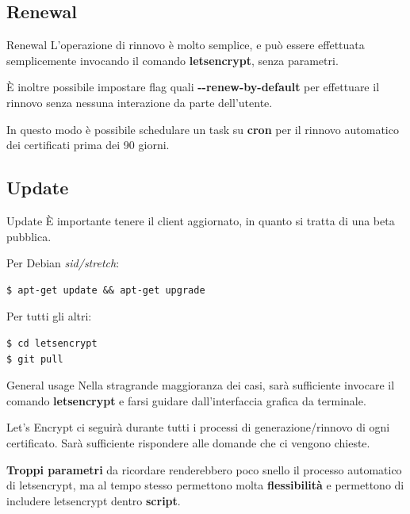 \documentclass[xcolor=svgnames,11pt]{beamer}
\begin{document}
\subsection{Renewal}
\begin{frame}[fragile]{Renewal}
L'operazione di rinnovo è molto semplice, e può essere effettuata semplicemente
invocando il comando \textbf{letsencrypt}, senza parametri.

\medskip\pause

È inoltre possibile impostare flag quali \textbf{-{}-renew-by-default} per effettuare
il rinnovo senza nessuna interazione da parte dell'utente.

\medskip\pause

In questo modo è possibile schedulare un task su \textbf{cron} per il rinnovo
automatico dei certificati prima dei 90 giorni.

\end{frame}

\subsection{Update}
\begin{frame}[fragile]{Update}
È importante tenere il client aggiornato, in quanto si tratta di una beta pubblica.


\medskip\pause
Per Debian \emph{sid/stretch}:
\begin{block}{}
\begin{scriptsize}
\begin{verbatim}
$ apt-get update && apt-get upgrade
\end{verbatim}
\end{scriptsize}
\end{block}

\medskip\pause
Per tutti gli altri:
\begin{block}{}
\begin{scriptsize}
\begin{verbatim}
$ cd letsencrypt
$ git pull
\end{verbatim}
\end{scriptsize}
\end{block}

\end{frame}

\begin{frame}[fragile]{General usage}
Nella stragrande maggioranza dei casi, sarà sufficiente invocare il comando
\textbf{letsencrypt} e farsi guidare dall'interfaccia grafica da terminale.

\medskip\pause

Let's Encrypt ci seguirà durante tutti i processi di generazione/rinnovo
di ogni certificato. Sarà sufficiente rispondere alle domande che ci vengono
chieste.

\medskip\pause

\textbf{Troppi parametri} da ricordare renderebbero poco snello il processo automatico
di letsencrypt, ma al tempo stesso permettono molta \textbf{flessibilità} e permettono
di includere letsencrypt dentro \textbf{script}.

\end{frame}
\end{document}
